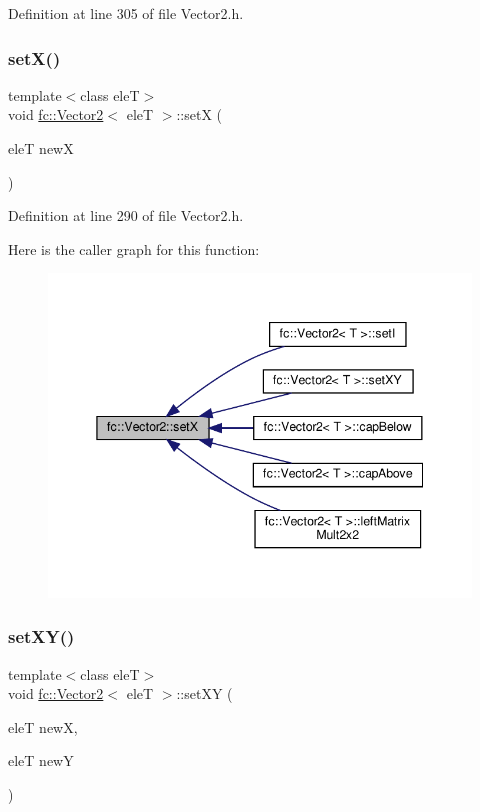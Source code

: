 Definition at line 305 of file Vector2.\+h.

\mbox{\label{classfc_1_1Vector2_a1e0a6cb9fe22295b81c7b8a91ba56c9e}} 
\subsubsection{\texorpdfstring{set\+X()}{setX()}}
{\footnotesize\ttfamily template$<$class eleT$>$ \\
void \hyperlink{classfc_1_1Vector2}{fc\+::\+Vector2}$<$ eleT $>$\+::setX (\begin{DoxyParamCaption}\item[{eleT}]{newX }\end{DoxyParamCaption})}



Definition at line 290 of file Vector2.\+h.

Here is the caller graph for this function\+:
\nopagebreak
\begin{figure}[H]
\begin{center}
\leavevmode
\includegraphics[width=345pt]{d9/d08/classfc_1_1Vector2_a1e0a6cb9fe22295b81c7b8a91ba56c9e_icgraph}
\end{center}
\end{figure}
\mbox{\label{classfc_1_1Vector2_a5aec5245348bcf0d5e5dda71b9178001}} 
\subsubsection{\texorpdfstring{set\+X\+Y()}{setXY()}\hspace{0.1cm}{\footnotesize\ttfamily [1/2]}}
{\footnotesize\ttfamily template$<$class eleT$>$ \\
void \hyperlink{classfc_1_1Vector2}{fc\+::\+Vector2}$<$ eleT $>$\+::set\+XY (\begin{DoxyParamCaption}\item[{eleT}]{newX,  }\item[{eleT}]{newY }\end{DoxyParamCaption})}



